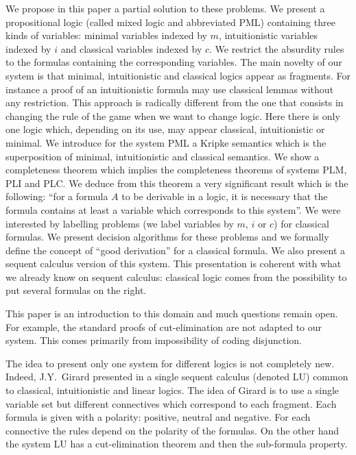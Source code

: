 \documentclass{jancl}
\begin{document}
We propose in this paper a partial solution to these problems. We
present a propositional logic (called mixed logic and abbreviated PML)
containing three kinds of variables: minimal variables indexed by
$m$, intuitionistic variables indexed by $i$ and classical variables
indexed by $c$. We restrict the absurdity rules to the formulas
containing the corresponding variables. The main novelty of our system
is that minimal, intuitionistic and classical logics appear as
fragments. For instance a proof of an intuitionistic formula may use
classical lemmas without any restriction. This approach is radically
different from the one that consists in changing the rule of the game
when we want to change logic. Here there is only one logic which,
depending on its use, may appear classical, intuitionistic or
minimal. We introduce for the system PML a Kripke semantics which is the
superposition of minimal, intuitionistic and classical semantics. We
show a completeness theorem which implies the completeness theorems of
systems PLM, PLI and PLC. We deduce from this theorem a very
significant result which is the following: ``for a formula $A$ to be
derivable in a logic, it is necessary that the formula contains at
least a variable which corresponds to this system''. We were
interested by labelling problems (we label variables by $m$, $i$ or
$c$) for classical formulas. We present decision algorithms for these
problems and we formally define the concept of ``good
derivation'' for a classical formula. We also present a sequent
calculus version of this system. This presentation is coherent with
what we already know on sequent calculus: classical logic comes from
the possibility to put several formulas on the
right.

This paper is an introduction to this domain and much questions remain
open. For example, the standard proofs of cut-elimination are not
adapted to our system. This comes primarily from impossibility of
coding disjunction.

The idea to present only one system for different logics is not
completely new.  Indeed, J.Y.\ Girard presented in \cite{GIR:1993}
a single sequent calculus (denoted LU) common to classical,
intuitionistic and linear logics. The idea of Girard is to use a
single variable set but different connectives which correspond to
each fragment. Each formula is given with a polarity: positive,
neutral and negative. For each connective the rules depend on the
polarity of the formulas. On the other hand the system LU has a
cut-elimination theorem and then the sub-formula property.
\end{document}
